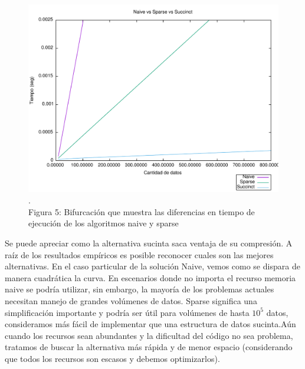 \documentclass[11pt]{article}
\begin{document}
\begin{center}\begin{figure}[htp]
\centering
\includegraphics[scale=0.6]{grafico.pdf}
\\\scriptsize{\color{white}.\color{black}\\Figura 5: Bifurcación que muestra las diferencias en tiempo de ejecución de los algoritmos naive y sparse}
\label{etiqueta}
\end{figure}
\end{center}
Se puede apreciar como la alternativa sucinta saca ventaja de su compresión. A raíz de los resultados empíricos es posible reconocer cuales son las mejores alternativas. En el caso particular de la solución Naive, vemos como se dispara de manera cuadrática la curva. En escenarios donde no importa el recurso memoria naive se podría utilizar, sin embargo, la mayoría de los problemas actuales necesitan manejo de grandes volúmenes de datos. Sparse significa una simplificación importante y podría ser útil para volúmenes de hasta $10^5$ datos, consideramos más fácil de implementar que una estructura de datos sucinta.Aún cuando los recursos sean abundantes y la dificultad del código no sea problema, tratamos de buscar la alternativa más rápida y de menor espacio (considerando que todos los recursos son escasos y debemos optimizarlos).
\end{document}
